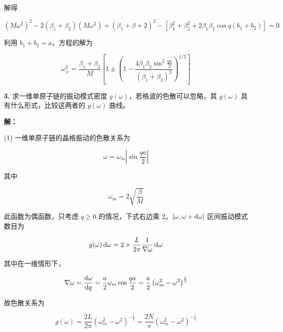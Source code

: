 解得

\begin{equation*}
    (M \omega^2)^2 - 2(\beta_1+\beta_2) (M \omega^2) + (\beta_1+\beta+2)^2 - \left[\beta_1^2 + \beta_2^2 + 2\beta_1\beta_2 \cos q(b_1+b_2)\right] = 0
\end{equation*}

利用 $b_1+b_2=a$，方程的解为

\begin{equation*}
    \omega_\pm^2 = \frac{\beta_1+\beta_2}{M} \left[1 \pm \left(1 - \frac{4\beta_1 \beta_2 \sin^2 \frac{qa}{2}}{(\beta_1+\beta_2)^2}\right)^{1/2}\right]
\end{equation*}


\noindent \textbf{3.\quad} 求一维单原子链的振动模式密度 $g(\omega)$，若格波的色散可以忽略，其 $g(\omega)$ 具有什么形式，比较这两者的 $g(\omega)$ 曲线。

\noindent \textbf{解：}

(1) 一维单原子链的晶格振动的色散关系为

\begin{equation*}
    \omega = \omega_m \left| \sin\frac{qa}{2} \right|
\end{equation*}

其中

\begin{equation*}
    \omega_m = 2 \sqrt{\frac{\beta}{M}}
\end{equation*}

此函数为偶函数，只考虑 $q \ge 0$ 的情况，下式右边乘 $2$。$[\omega, \omega+\mathop{}\!\mathrm{d}\omega]$ 区间振动模式数目为

\begin{equation*}
    g(\omega) \mathop{}\!\mathrm{d} \omega = 2 \times \frac{L}{2\pi} \frac{1}{\nabla \omega} \mathop{}\!\mathrm{d}\omega
\end{equation*}

其中在一维情形下，

\begin{equation*}
    \nabla \omega = \frac{\mathop{}\!\mathrm{d} \omega}{\mathop{}\!\mathrm{d} q} = \frac{a}{2} \omega_m \cos \frac{qa}{2} = \frac{a}{2} \left(\omega_m^2 - \omega^2\right)^{\frac{1}{2}}
\end{equation*}

故色散关系为

\begin{equation*}
    g(\omega) = \frac{2L}{2\pi} \left(\omega_m^2 - \omega^2\right)^{-\frac{1}{2}} = \frac{2N}{\pi} \left(\omega_m^2 - \omega^2\right)^{-\frac{1}{2}}
\end{equation*}

